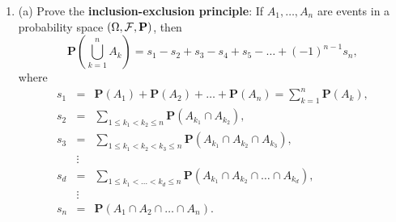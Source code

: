 \documentclass[12pt]{article}
\newcommand{\R}{\mathbb{R}}
\newcommand{\prob}{\mathbf{P}}
\theoremstyle{example}
\begin{document}
\begin{enumerate}
\medskip \noindent
(b) If $\lambda>0$, we say that a random variable has the exponential distribution with parameter $\lambda$ if
$$ F_X(x) = \begin{cases} 0 & x<0, \\ 1-e^{-\lambda x} & x \ge 0, \end{cases} $$
and denote this $X \sim \textrm{Exp}(\lambda). $
Find an algorithm to produce a random variable with $\textrm{Exp}(\lambda)$ distribution using a random number generator that produces uniform random numbers in $(0,1)$. In other words, if $U \sim U(0,1)$, find a function $g:(0,1)\to\R$ such that the random variable $X=g(U)$ has distribution $\textrm{Exp}(\lambda)$.

\medskip\noindent
(c) We say that a non-negative random variable $X\ge 0$ has the \textbf{lack of memory property} if it satisfies
that 
$$ \prob(X \ge t\ |\ X \ge s) = \prob(X \ge t-s)\qquad \textrm{ for all $0<s<t$}.$$
Prove that exponential random variables have the lack of memory property.

\medskip\noindent
(d) Prove that any non-negative random variable that has the lack of memory property has the exponential distribution with some parameter $\lambda>0$. (This is easier if one assumes that the function $G(x)=\prob(X\ge x)$ is differentiable on $[0,\infty)$, so you can make this assumption if you fail to find a more general argument).



\item (a) Prove the \textbf{inclusion-exclusion principle}: If $A_1,\ldots,A_n$ are events in a probability space $(\Omega, {\cal F}, \prob)$, then
$$ \prob\left(\bigcup_{k=1}^n A_k\right) = s_1 - s_2 + s_3 - s_4 + s_5 - \ldots + (-1)^{n-1} s_n, $$
where
\begin{eqnarray*}
s_1 &=& \prob(A_1) + \prob(A_2) + \ldots + \prob(A_n) = \sum_{k=1}^n \prob(A_k), \\
s_2 &=& \sum_{1\le k_1 < k_2 \le n} \prob(A_{k_1} \cap A_{k_2}), \\ 
s_3 &=& \sum_{1\le k_1 < k_2 < k_3 \le n} \prob(A_{k_1} \cap A_{k_2} \cap A_{k_3}), \\ 
& \vdots &  \\
s_d &=& \sum_{1\le k_1 < \ldots< k_d \le n} \prob(A_{k_1} \cap A_{k_2} \cap \ldots \cap A_{k_d}), \\ 
& \vdots &  \\s_n &=& \prob(A_1 \cap A_2 \cap \ldots \cap A_n).
\end{eqnarray*}


\end{enumerate}
\end{document}
